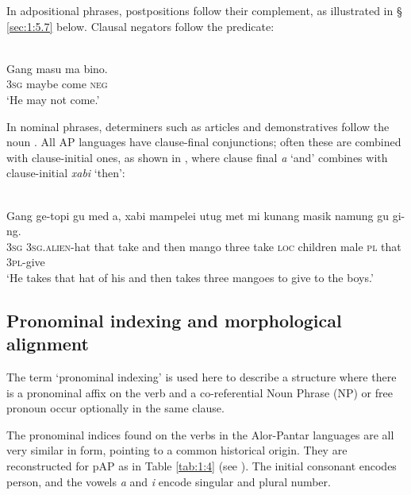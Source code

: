  


In adpositional phrases, postpositions follow their complement, as illustrated in {\S} \ref{sec:1:5.7} below. Clausal negators follow the predicate:  


\ea%
\label{ex:1:2}
\\
\gll Gang  masu  ma  bino. \\
\textsc{3sg} maybe  come  \textsc{neg} \\
\glt  `He may not come.' 
\z
 





In nominal phrases, determiners such as articles and demonstratives follow the noun \citep[see][]{KlamerSchapperCorbettTVnumeralwords}. All AP languages have clause-final conjunctions; often these are combined with clause-initial ones, as shown in , where clause final \textit{a} `and' combines with clause-initial \textit{xabi} `then': 



\ea%
\label{ex:1:3}
\\
\gll Gang  ge-topi  gu  med  a, xabi  mampelei  utug  met  mi  kunang  masik   namung  gu  gi-ng. \\
 \textsc{3sg}  \textsc{3sg.alien-}hat  that  take  and  then  mango  three  take  \textsc{loc} children  male  \textsc{pl} that  \textsc{3pl}{}-give     \\
\glt  `He takes that hat of his and  then takes three mangoes to give to the boys.'   
\z


\subsection{Pronominal indexing and morphological alignment}\label{sec:1:5.2}
The term `pronominal indexing' is used here \citep[and in][]{FeddenEtAlTV} to describe a structure where there is a pronominal affix on the verb and a co-referential Noun Phrase (NP) or free pronoun occur optionally in the same clause. 

The pronominal indices found on the verbs in the Alor-Pantar languages are all very similar in form, pointing to a common historical origin. They are reconstructed for pAP as in Table \ref{tab:1:4} (see \citealt{HoltonRobinsonTVhistory,HoltonRobinsonTVposition,SchapperEtAlTVtimor}). The initial consonant encodes person, and the vowels \textit{a} and \textit{i} encode singular and plural number.  

